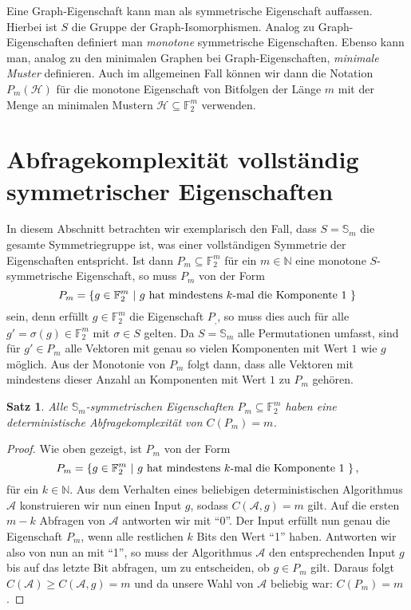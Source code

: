 \documentclass[10pt,a4paper, footheight=1mm, bibliography=totoc]{scrreprt}
\newtheorem{Satz}[definition]{Satz}
\theoremstyle{definition}
\begin{document}
Eine Graph-Eigenschaft kann man als symmetrische
Eigenschaft auffassen. Hierbei ist $S$ die Gruppe
der Graph-Isomorphismen.
Analog zu Graph-Eigenschaften definiert man
\emph{monotone} symmetrische Eigenschaften. 
Ebenso kann man, analog zu den minimalen Graphen bei
Graph-Eigenschaften, \emph{minimale Muster} definieren.
Auch im allgemeinen Fall können wir dann die Notation
$P_m(\mathcal{H})$ für die monotone Eigenschaft
von Bitfolgen der Länge $m$ mit der Menge an minimalen
Mustern $\mathcal{H}\subseteq \mathbb{F}_2^m$ verwenden.

\section{Abfragekomplexität vollständig symmetrischer Eigenschaften}
In diesem Abschnitt betrachten wir exemplarisch
den Fall, dass $S=\mathbb{S}_m$ die gesamte Symmetriegruppe
ist, was einer vollständigen Symmetrie der Eigenschaften entspricht.
Ist dann $P_m\subseteq \mathbb{F}_2^m$ für ein $m\in\mathbb{N}$ eine monotone 
$S$-symmetrische Eigenschaft, so muss 
$P_m$ von der Form 
$$ P_m= \{ g\in \mathbb{F}_2^m \ |
\ g \textup{ hat mindestens } k\textup{-mal die Komponente } 1 \ \}$$
sein, denn erfüllt $g\in \mathbb{F}_2^m$ die Eigenschaft
$P_,$, so muss dies auch für alle $g'=\sigma(g)\in\mathbb{F}_2^m$
mit $\sigma\in S$ gelten. Da $S=\mathbb{S}_m$ alle Permutationen
umfasst, sind für $g'\in P_m$ alle Vektoren mit
genau so vielen Komponenten mit Wert $1$ wie $g$ möglich. Aus der
Monotonie von $P_m$ folgt dann, dass alle Vektoren mit
mindestens dieser Anzahl an Komponenten mit Wert $1$ zu
$P_m$ gehören.
\begin{Satz}
\label{thm:SymmetrischeGruppe}
Alle $\mathbb{S}_m$-symmetrischen Eigenschaften 
$P_m \subseteq \mathbb{F}_2^m$ haben eine
deterministische Abfragekomplexität
von $C(P_m) = m$.
\end{Satz}
\begin{proof}
Wie oben gezeigt, ist $P_m$ von der Form
$$ P_m= \{ g\in \mathbb{F}_2^m \ |
\ g \textup{ hat mindestens } k\textup{-mal die Komponente } 1 \ \}\,,$$
für ein $k\in \mathbb{N}$.
Aus dem Verhalten eines beliebigen deterministischen Algorithmus
$\mathcal{A}$ konstruieren wir nun einen Input $g$,
sodass $C(\mathcal{A},g)=m$ gilt. Auf die ersten $m-k$
Abfragen von $\mathcal{A}$ antworten wir mit "`0"'.
Der Input erfüllt nun genau die Eigenschaft $P_m$, wenn
alle restlichen $k$ Bits den Wert "`1"' haben.
Antworten wir also von nun an mit "`1"', so muss der 
Algorithmus $\mathcal{A}$
den entsprechenden Input $g$ bis auf das letzte Bit abfragen,
um zu entscheiden, ob $g\in P_m$ gilt. Daraus folgt
$C(\mathcal{A}) \geq C(\mathcal{A}, g) = m$ und da unsere
Wahl von $\mathcal{A}$ beliebig war: $C(P_m)=m$.
\end{proof}
\end{document}
